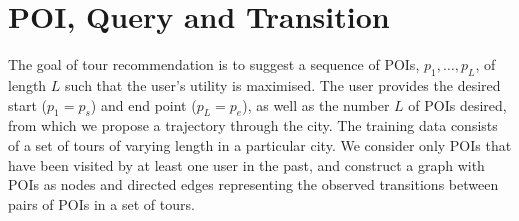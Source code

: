 
\secmoveup
\section{POI, Query and Transition}
\label{sec:feature}

The goal of tour recommendation is to suggest a sequence of POIs, $p_1, \ldots, p_L$, of length $L$ such that the user's utility is maximised. The user provides the desired start ($p_1=p_s$) and end point ($p_L=p_e$), as well as the number $L$ of POIs desired, from which we propose a trajectory through the city.
%
%
The training data consists of a set of tours of varying length in a particular city.
We consider only POIs that have been visited by at least one user in the past, and
construct a graph with POIs as nodes and directed edges representing the observed transitions between pairs of POIs in a set of tours.




